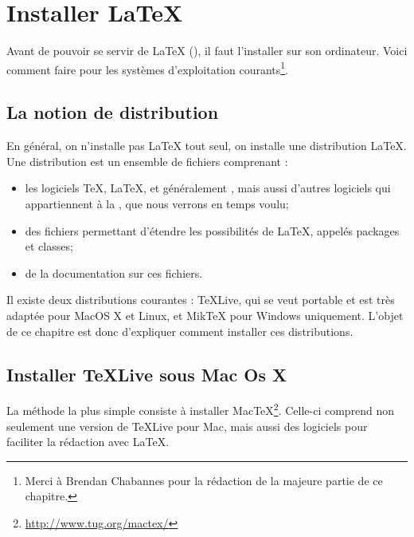 \chapter {Installer \LaTeX{}}\label{install}

\begin{intro}
    Avant de pouvoir se servir de \LaTeX{} (\XeLaTeX), il faut l'installer sur son ordinateur. Voici comment faire pour les systèmes d'exploitation courants\footnote{Merci à Brendan Chabannes pour la rédaction de la majeure partie de ce chapitre.}.
\end{intro}

\section{La notion de distribution}

En général, on n'installe pas \LaTeX{} tout seul, on installe une distribution \LaTeX{}. Une distribution est un ensemble de fichiers comprenant :
\begin{itemize}
\item les logiciels \TeX, \LaTeX, et généralement \XeLaTeX, mais aussi d'autres logiciels qui appartiennent à la  , que nous verrons en temps voulu;
\item des fichiers permettant d'étendre les possibilités de \LaTeX, appelés packages et classes;
\item de la documentation sur ces fichiers.
\end{itemize}

Il existe deux distributions courantes : TeXLive, qui se veut portable et est très adaptée pour MacOS X et Linux, et MikTeX pour Windows uniquement. L'objet de ce chapitre est donc d'expliquer comment installer ces distributions.

\section{Installer TeXLive sous Mac Os X}

La méthode la plus simple consiste à installer MacTeX\footnote{\url{http://www.tug.org/mactex/}}. Celle-ci comprend non seulement une version de TeXLive pour Mac, mais aussi des logiciels pour faciliter la rédaction avec \LaTeX{}.

